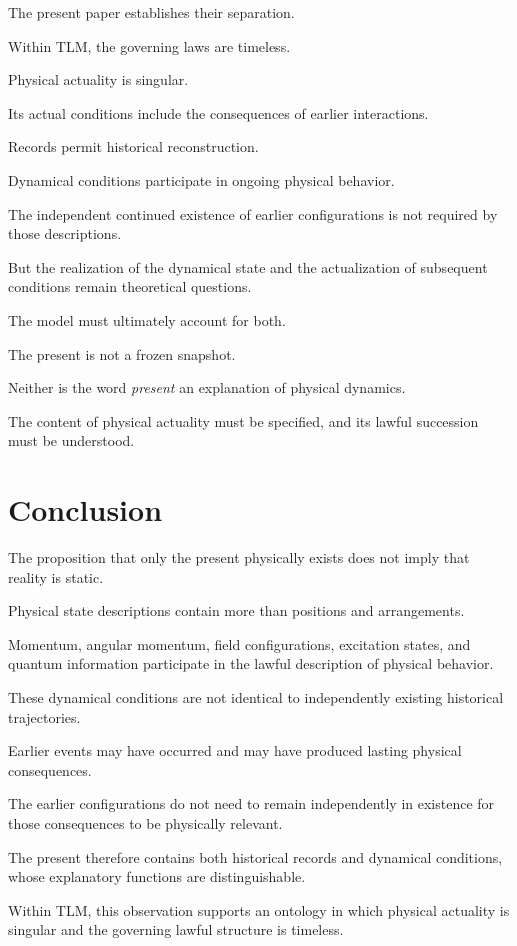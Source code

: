 \documentclass[12pt,onecolumn]{article}
\begin{document}
The present paper establishes their separation.

Within TLM, the governing laws are timeless.

Physical actuality is singular.

Its actual conditions include the consequences of earlier interactions.

Records permit historical reconstruction.

Dynamical conditions participate in ongoing physical behavior.

The independent continued existence of earlier configurations is not required by those descriptions.

But the realization of the dynamical state and the actualization of subsequent conditions remain theoretical questions.

The model must ultimately account for both.

The present is not a frozen snapshot.

Neither is the word \emph{present} an explanation of physical dynamics.

The content of physical actuality must be specified, and its lawful succession must be understood.


\section{Conclusion}

The proposition that only the present physically exists does not imply that reality is static.

Physical state descriptions contain more than positions and arrangements.

Momentum, angular momentum, field configurations, excitation states, and quantum information participate in the lawful description of physical behavior.

These dynamical conditions are not identical to independently existing historical trajectories.

Earlier events may have occurred and may have produced lasting physical consequences.

The earlier configurations do not need to remain independently in existence for those consequences to be physically relevant.

The present therefore contains both historical records and dynamical conditions, whose explanatory functions are distinguishable.

Within TLM, this observation supports an ontology in which physical actuality is singular and the governing lawful structure is timeless.
\end{document}
